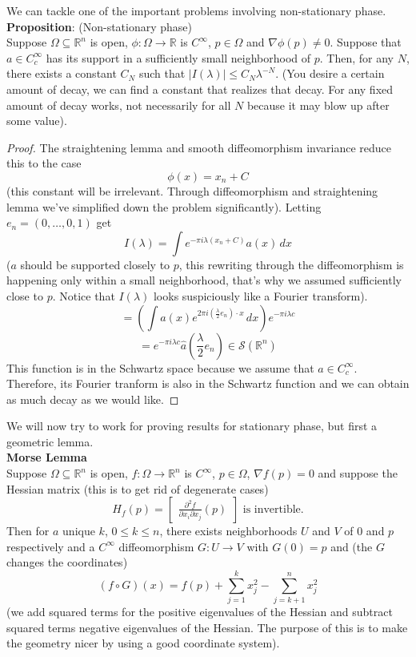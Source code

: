 \documentclass[12pt]{article}
\begin{document}
\noindent We can tackle one of the important problems involving non-stationary phase. \\

\noindent \textbf{Proposition}: (Non-stationary phase) \\
\noindent Suppose $\Omega \subseteq \mathbb{R}^n$ is open, $\phi: \Omega \rightarrow \mathbb{R}$ is $C^\infty$, $p \in \Omega$ and $\nabla \phi(p) \not= 0$. Suppose that $a \in C^\infty_c$ has its support in a sufficiently small neighborhood of $p$. Then, for any $N$, there exists a constant $C_N$  such that $\vert I (\lambda) \vert \leq C_N\lambda^{-N}$. (You desire a certain amount of decay, we can find a constant that realizes that decay. For any fixed amount of decay works, not necessarily for all $N$ because it may blow up after some value).

\begin{proof}
The straightening lemma and smooth diffeomorphism invariance reduce this to the case
$$\phi(x)= x_n + C$$
(this constant will be irrelevant. Through diffeomorphism and straightening lemma we've simplified down the problem significantly). Letting $e_n = (0 , \dots, 0 ,1) $ get 
$$I(\lambda) = \int e^{-\pi i \lambda (x_n + C)}a(x) \,dx$$
($a$ should be supported closely to $p$, this rewriting through the diffeomorphism is happening only within a small neighborhood, that's why we assumed sufficiently close to $p$. Notice that $I(\lambda)$ looks suspiciously like a Fourier transform). 
$$=(\int a(x) e^{2\pi i (\frac{\lambda}{2}e_n) \cdot x} \, dx) e^{-\pi i \lambda c}$$
$$ = e^{-\pi i \lambda c} \hat{a}(\frac{\lambda}{2} e_n) \in \mathcal{S}(\mathbb{R}^n)$$
This function is in the Schwartz space because we assume that $a \in C_c^\infty$. Therefore, its Fourier tranform is also in the Schwartz function and we can obtain as much decay as we would like. 
\end{proof}
\noindent We will now try to work for proving results for stationary phase, but first a geometric lemma. \\

\noindent \textbf{Morse Lemma} \\
\noindent Suppose $\Omega \subseteq \mathbb{R}^n$ is open, $f: \Omega \rightarrow \mathbb{R}^n$ is $C^\infty$, $p \in \Omega$, $\nabla f (p) = 0$  and suppose the Hessian matrix (this is to get rid of degenerate cases)
$$H_f(p) = \begin{bmatrix}\frac{\partial^2 f}{\partial x_i \partial x_j} (p) \end{bmatrix} \text{ is invertible}.$$
Then for $a$ unique $k$, $0 \leq k \leq n$, there exists neighborhoods $U$ and $V$ of $0$ and $p$ respectively and a $C^\infty$ diffeomorphism $G: U \rightarrow V$ with $G(0)=p$ and (the $G$ changes the coordinates)
$$(f \circ G) (x) = f(p) + \sum_{j=1}^k x_j^2 - \sum_{j=k+1}^n x_j^2$$
(we add squared terms for the positive eigenvalues of the Hessian and subtract squared terms negative eigenvalues of the Hessian. The purpose of this is to make the geometry nicer by using a good coordinate system).
\end{document}
